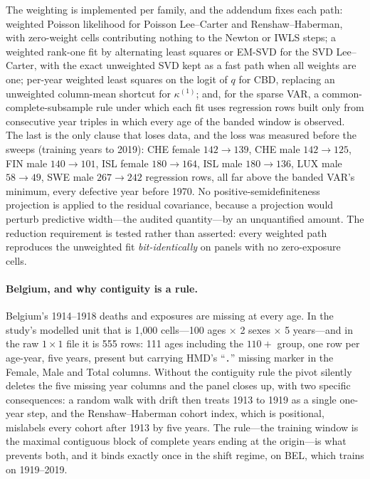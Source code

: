The weighting is implemented per family, and the addendum fixes each path:
weighted Poisson likelihood for Poisson Lee--Carter and Renshaw--Haberman,
with zero-weight cells contributing nothing to the Newton or IWLS steps; a
weighted rank-one fit by alternating least squares or EM-SVD for the SVD
Lee--Carter, with the exact unweighted SVD kept as a fast path when all
weights are one; per-year weighted least squares on the logit of $q$ for CBD,
replacing an unweighted column-mean shortcut for $\kappa^{(1)}$; and, for the
sparse VAR, a common-complete-subsample rule under which each fit uses
regression rows built only from consecutive year triples in which every age of
the banded window is observed. The last is the only clause that loses data,
and the loss was measured before the sweeps (training years to 2019): CHE
female $142\to139$, CHE male $142\to125$, FIN male $140\to101$, ISL female
$180\to164$, ISL male $180\to136$, LUX male $58\to49$, SWE male $267\to242$
regression rows, all far above the banded VAR's minimum, every defective year
before 1970. No positive-semidefiniteness projection is applied to the
residual covariance, because a projection would perturb predictive width---the
audited quantity---by an unquantified amount. The reduction requirement is
tested rather than asserted: every weighted path reproduces the unweighted fit
\emph{bit-identically} on panels with no zero-exposure cells.

\paragraph{Belgium, and why contiguity is a rule.} Belgium's 1914--1918 deaths
and exposures are missing at every age. In the study's modelled unit that is
1{,}000 cells---100 ages $\times$ 2 sexes $\times$ 5 years---and in the raw
$1\times1$ file it is 555 rows: 111 ages including the $110{+}$ group, one row
per age-year, five years, present but carrying HMD's ``\texttt{.}'' missing
marker in the Female, Male and Total columns. Without the contiguity rule the
pivot silently deletes the five missing year columns and the panel closes up,
with two specific consequences: a random walk with drift then treats 1913 to
1919 as a single one-year step, and the Renshaw--Haberman cohort index, which
is positional, mislabels every cohort after 1913 by five years. The rule---the
training window is the maximal contiguous block of complete years ending at
the origin---is what prevents both, and it binds exactly once in the shift
regime, on BEL, which trains on 1919--2019.

